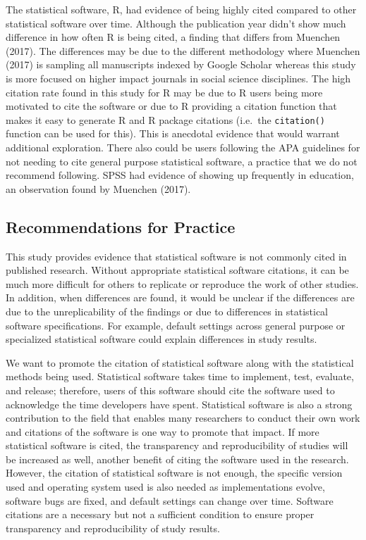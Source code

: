 \documentclass[
  english,
  ,man]{apa6}
\begin{document}
The statistical software, R, had evidence of being highly cited compared to other statistical software over time. Although the publication year didn't show much difference in how often R is being cited, a finding that differs from Muenchen (2017). The differences may be due to the different methodology where Muenchen (2017) is sampling all manuscripts indexed by Google Scholar whereas this study is more focused on higher impact journals in social science disciplines. The high citation rate found in this study for R may be due to R users being more motivated to cite the software or due to R providing a citation function that makes it easy to generate R and R package citations (i.e.~the \texttt{citation()} function can be used for this). This is anecdotal evidence that would warrant additional exploration. There also could be users following the APA guidelines for not needing to cite general purpose statistical software, a practice that we do not recommend following. SPSS had evidence of showing up frequently in education, an observation found by Muenchen (2017).

\hypertarget{recommendations-for-practice}{%
\subsection{Recommendations for Practice}\label{recommendations-for-practice}}

This study provides evidence that statistical software is not commonly cited in published research. Without appropriate statistical software citations, it can be much more difficult for others to replicate or reproduce the work of other studies. In addition, when differences are found, it would be unclear if the differences are due to the unreplicability of the findings or due to differences in statistical software specifications. For example, default settings across general purpose or specialized statistical software could explain differences in study results.

We want to promote the citation of statistical software along with the statistical methods being used. Statistical software takes time to implement, test, evaluate, and release; therefore, users of this software should cite the software used to acknowledge the time developers have spent. Statistical software is also a strong contribution to the field that enables many researchers to conduct their own work and citations of the software is one way to promote that impact. If more statistical software is cited, the transparency and reproducibility of studies will be increased as well, another benefit of citing the software used in the research. However, the citation of statistical software is not enough, the specific version used and operating system used is also needed as implementations evolve, software bugs are fixed, and default settings can change over time. Software citations are a necessary but not a sufficient condition to ensure proper transparency and reproducibility of study results.
\end{document}
